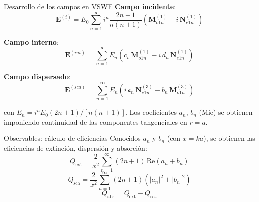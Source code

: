 \documentclass[aspectratio=43,11pt]{beamer}
\begin{document}
\begin{frame}{Desarrollo de los campos en VSWF}
  \vspace{2pt}
  \footnotesize
  \textbf{Campo incidente}:
  \begin{equation*}
    \mathbf{E}^{(i)} = E_0\sum_{n=1}^{\infty}i^n\frac{2n+1}{n(n+1)}
    \!\left(\mathbf{M}^{(1)}_{o1n} - i\,\mathbf{N}^{(1)}_{e1n}\right)
  \end{equation*}

  \textbf{Campo interno}:
  \begin{equation*}
    \mathbf{E}^{(int)} = \sum_{n=1}^{\infty}E_n
    \!\left(c_n\,\mathbf{M}^{(1)}_{o1n} - i\,d_n\,\mathbf{N}^{(1)}_{e1n}\right)
  \end{equation*}

  \textbf{Campo dispersado}:
  \begin{equation*}
    \mathbf{E}^{(sca)} = \sum_{n=1}^{\infty}E_n
    \!\left(i\,a_n\,\mathbf{N}^{(3)}_{e1n} - b_n\,\mathbf{M}^{(3)}_{o1n}\right)
  \end{equation*}

  \vspace{2pt}
  con $E_n = i^n E_0(2n+1)/[n(n+1)]$. Los coeficientes $a_n,\,b_n$ (Mie) se obtienen
  imponiendo continuidad de las componentes tangenciales en $r=a$.
\end{frame}

\begin{frame}{Observables: cálculo de eficiencias}
  \vspace{6pt}
  Conocidos $a_n$ y $b_n$ (con $x=ka$), se obtienen las \alert{eficiencias} de
  extinción, dispersión y absorción:
  \vspace{2pt}
  \begin{equation*}
    Q_\text{ext} = \frac{2}{x^2}\sum_{n=1}^{\infty}(2n+1)\,\mathrm{Re}(a_n+b_n)
  \end{equation*}
  \begin{equation*}
    Q_\text{sca} = \frac{2}{x^2}\sum_{n=1}^{\infty}(2n+1)\left(|a_n|^2+|b_n|^2\right)
  \end{equation*}
  \begin{equation*}
    Q_\text{abs} = Q_\text{ext} - Q_\text{sca}
  \end{equation*}
\end{frame}
\end{document}
